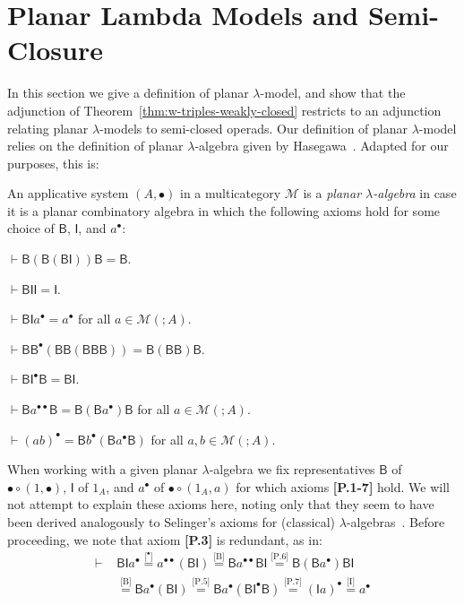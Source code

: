 \documentclass{llncs}
\begin{document}
\section{Planar Lambda Models and Semi-Closure}\label{sec:planar-adjunction}
In this section we give a definition of planar $\lambda$-model, and show that the adjunction of Theorem~\ref{thm:w-triples-weakly-closed} restricts to an adjunction relating planar $\lambda$-models to semi-closed operads. Our definition of planar $\lambda$-model relies on the definition of planar $\lambda$-algebra given by Hasegawa~\cite{Hasegawa2023Planar}. Adapted for our purposes, this is:
\begin{definition}\label{def:planar-lambda-algebra}
  An applicative system $(A,\bullet)$ in a multicategory $\mathcal{M}$ is a \emph{planar $\lambda$-algebra} in case it is a planar combinatory algebra in  which the following axioms hold for some choice of $\mathsf{B}$, $\mathsf{I}$, and $a^\bullet$:
  \begin{enumerate}[{\bf [P.1]}]
  \item $\vdash \mathsf{B}(\mathsf{B}(\mathsf{B}\mathsf{I}))\mathsf{B} = \mathsf{B}$.
  \item $\vdash \mathsf{BII} = \mathsf{I}$.
  \item $\vdash \mathsf{BI}a^\bullet = a^\bullet$ for all $a \in \mathcal{M}(;A)$.
  \item $\vdash \mathsf{BB}^\bullet(\mathsf{BB}(\mathsf{BBB})) = \mathsf{B}(\mathsf{BB})\mathsf{B}$.
  \item $\vdash \mathsf{BI}^\bullet\mathsf{B} = \mathsf{BI}$.
  \item $\vdash \mathsf{B}a^{\bullet \bullet}\mathsf{B} = \mathsf{B}(\mathsf{B}a^\bullet)\mathsf{B}$ for all $a \in \mathcal{M}(;A)$.
  \item $\vdash (ab)^\bullet = \mathsf{B}b^\bullet(\mathsf{B}a^\bullet\mathsf{B})$ for all $a,b \in \mathcal{M}(;A)$.
  \end{enumerate}
\end{definition}
When working with a given planar $\lambda$-algebra we fix representatives $\mathsf{B}$ of $\bullet \circ (1,\bullet)$, $\mathsf{I}$ of $1_A$, and $a^\bullet$ of $\bullet \circ (1_A,a)$ for which axioms {\bf [P.1-7]} hold. We will not attempt to explain these axioms here, noting only that they seem to have been derived analogously to Selinger's axioms for (classical) $\lambda$-algebras~\cite{Selinger2002}. Before proceeding, we note that axiom {\bf [P.3]} is redundant, as in: 
\begin{align*}
    \vdash \,\,&\mathsf{BI}a^\bullet
    \overset{\text{[$^\bullet$]}}{=} a^{\bullet \bullet}(\mathsf{BI})
    \overset{\text{[B]}}{=} \mathsf{B}a^{\bullet \bullet}\mathsf{BI}
    \overset{\text{[P.6]}}{=} \mathsf{B}(\mathsf{B}a^\bullet)\mathsf{BI}
    \\& \overset{\text{[B]}}{=} \mathsf{B}a^\bullet(\mathsf{BI})
    \overset{\text{[P.5]}}{=} \mathsf{B}a^\bullet(\mathsf{BI}^\bullet \mathsf{B})
    \overset{\text{[P.7]}}{=} (\mathsf{I}a)^\bullet
    \overset{\text{[I]}}{=} a^\bullet
\end{align*}
\end{document}

